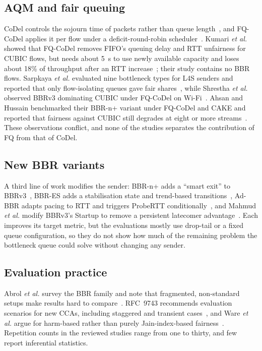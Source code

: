 \documentclass[conference]{IEEEtran}
\begin{document}
\subsection{AQM and fair queuing}
CoDel controls the sojourn time of packets rather than queue length~\cite{nichols2012codel,rfc8289}, and FQ-CoDel applies it per flow under a deficit-round-robin scheduler~\cite{rfc8290}. Kumari \emph{et al.} showed that FQ-CoDel removes FIFO's queuing delay and RTT unfairness for CUBIC flows, but needs about 5~s to use newly available capacity and loses about 18\% of throughput after an RTT increase~\cite{kumari2025cubic}; their study contains no BBR flows. Sarpkaya \emph{et al.} evaluated nine bottleneck types for L4S senders and reported that only flow-isolating queues gave fair shares~\cite{sarpkaya2025l4s}, while Shrestha \emph{et al.} observed BBRv3 dominating CUBIC under FQ-CoDel on Wi-Fi~\cite{shrestha2025wifi}. Ahsan and Hussain benchmarked their BBR-n+ variant under FQ-CoDel and CAKE and reported that fairness against CUBIC still degrades at eight or more streams~\cite{ahsan2026bbrn}. These observations conflict, and none of the studies separates the contribution of FQ from that of CoDel.

\subsection{New BBR variants}
A third line of work modifies the sender: BBR-n+ adds a ``smart exit'' to BBRv3~\cite{ahsan2026bbrn}, BBR-ES adds a stabilisation state and trend-based transitions~\cite{han2026bbres}, Ad-BBR adapts pacing to RTT and triggers ProbeRTT conditionally~\cite{wang2025adbbr}, and Mahmud \emph{et al.} modify BBRv3's Startup to remove a persistent latecomer advantage~\cite{mahmud2026startup}. Each improves its target metric, but the evaluations mostly use drop-tail or a fixed queue configuration, so they do not show how much of the remaining problem the bottleneck queue could solve without changing any sender.

\subsection{Evaluation practice}
Abrol \emph{et al.} survey the BBR family and note that fragmented, non-standard setups make results hard to compare~\cite{abrol2026survey}. RFC~9743 recommends evaluation scenarios for new CCAs, including staggered and transient cases~\cite{rfc9743}, and Ware \emph{et al.} argue for harm-based rather than purely Jain-index-based fairness~\cite{ware2019harm}. Repetition counts in the reviewed studies range from one to thirty, and few report inferential statistics.
\end{document}
